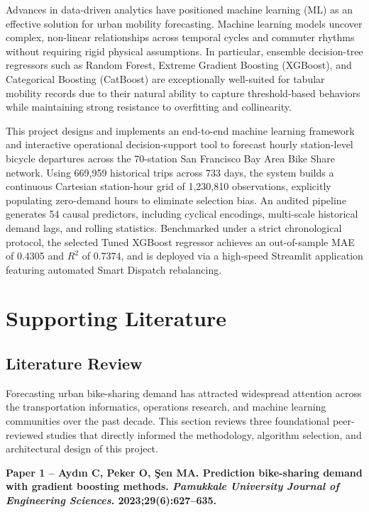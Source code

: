 \documentclass[12pt, a4paper]{article}
\renewcommand{\_}{\textunderscore\allowbreak}
\begin{document}
Advances in data-driven analytics have positioned machine learning (ML) as an effective solution for urban mobility forecasting. Machine learning models uncover complex, non-linear relationships across temporal cycles and commuter rhythms without requiring rigid physical assumptions. In particular, ensemble decision-tree regressors such as Random Forest, Extreme Gradient Boosting (XGBoost), and Categorical Boosting (CatBoost) are exceptionally well-suited for tabular mobility records due to their natural ability to capture threshold-based behaviors while maintaining strong resistance to overfitting and collinearity.

This project designs and implements an end-to-end machine learning framework and interactive operational decision-support tool to forecast hourly station-level bicycle departures across the 70-station San Francisco Bay Area Bike Share network. Using 669,959 historical trips across 733 days, the system builds a continuous Cartesian station-hour grid of 1,230,810 observations, explicitly populating zero-demand hours to eliminate selection bias. An audited pipeline generates 54 causal predictors, including cyclical encodings, multi-scale historical demand lags, and rolling statistics. Benchmarked under a strict chronological protocol, the selected Tuned XGBoost regressor achieves an out-of-sample MAE of 0.4305 and $R^2$ of 0.7374, and is deployed via a high-speed Streamlit application featuring automated Smart Dispatch rebalancing.
\clearpage

\section{Supporting Literature}

\subsection{Literature Review}
Forecasting urban bike-sharing demand has attracted widespread attention across the transportation informatics, operations research, and machine learning communities over the past decade. This section reviews three foundational peer-reviewed studies that directly informed the methodology, algorithm selection, and architectural design of this project.

\vspace{0.3cm}
\noindent \textbf{Paper 1 -- Ayd{\i}n C, Peker O, {\c{S}}en MA. Prediction bike-sharing demand with gradient boosting methods. \textit{Pamukkale University Journal of Engineering Sciences}. 2023;29(6):627--635.}
\end{document}

